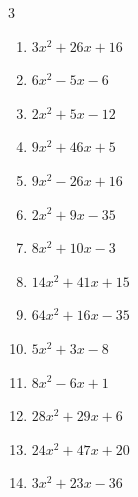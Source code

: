 \begin{multicols}{3}
\begin{enumerate}
        \phantom{$=(8x+9)(2x-3)$}

  \item $3x^{2}+26x+16$

        \phantom{$=(3x+2)(x+8)$}

  \item $6x^{2}-5x-6$

        \phantom{$=(2x-3)(3x+2)$}

  \item $2x^{2}+5x-12$

        \phantom{$=(2x-3)(x+4)$}

  \item $9x^{2}+46x+5$

        \phantom{$=(9x+1)(x+5)$}

  \item $9x^{2}-26x+16$

        \phantom{$=(x-2)(9x-8)$}

  \item $2x^{2}+9x-35$

        \phantom{$=(x+7)(2x-5)$}

  \item $8x^{2}+10x-3$

        \phantom{$=(4x-1)(2x+3)$}

  \item $14x^{2}+41x+15$

        \phantom{$=(7x+3)(2x+5)$}

  \item $64x^{2}+16x-35$

        \phantom{$=(8x-5)(8x+7)$}

\columnbreak %

  \item $5x^{2}+3x-8$

        \phantom{$=(5x+8)(x-1)$}

  \item $8x^{2}-6x+1$

        \phantom{$=(2x-1)(4x-1)$}

  \item $28x^{2}+29x+6$

        \phantom{$=(7x+2)(4x+3)$}

  \item $24x^{2}+47x+20$

        \phantom{$=(3x+4)(8x+5)$}

  \item $3x^{2}+23x-36$

        \phantom{$=(3x-4)(x+9)$}


\end{enumerate}
\end{multicols}
